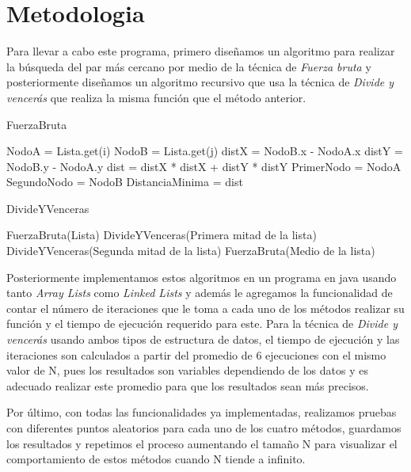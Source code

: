 \section{Metodologia}
Para llevar a cabo este programa, primero diseñamos un algoritmo para realizar la búsqueda del par más cercano por medio de la técnica de \textit{Fuerza bruta} y posteriormente diseñamos un algoritmo recursivo que usa la técnica de \textit{Divide y vencerás} que realiza la misma función que el método anterior.

\begin{algorithm}[H]	
\caption{FuerzaBruta}	
\begin{algorithmic}
\STATE NodoA = Lista.get(i)
\STATE NodoB = Lista.get(j)
\STATE distX = NodoB.x - NodoA.x
\STATE distY = NodoB.y - NodoA.y
\STATE dist = distX * distX + distY * distY
\STATE PrimerNodo = NodoA
\STATE SegundoNodo = NodoB
\STATE DistanciaMinima = dist
\ENDIF
\ENDFOR
\ENDFOR
\end{algorithmic}
\label{algo:factorial}	
\end{algorithm}

\begin{algorithm}[H]	
\caption{DivideYVenceras}	
\begin{algorithmic}
\STATE FuerzaBruta(Lista)
\ELSE
\STATE DivideYVenceras(Primera mitad de la lista)
\STATE DivideYVenceras(Segunda mitad de la lista)
\STATE FuerzaBruta(Medio de la lista)
\ENDIF
\end{algorithmic}
\label{algo:factorial}	
\end{algorithm}

Posteriormente implementamos estos algoritmos en un programa en java usando tanto \textit{Array Lists} como \textit{Linked Lists} y además le agregamos la funcionalidad de contar el número de iteraciones que le toma a cada uno de los métodos realizar su función y el tiempo de ejecución requerido para este. Para la técnica de \textit{Divide y vencerás} usando ambos tipos de estructura de datos, el tiempo de ejecución y las iteraciones son calculados a partir del promedio de  6 ejecuciones con el mismo valor de N, pues los resultados son variables dependiendo de los datos y es adecuado realizar este promedio para que los resultados sean más precisos.

Por último, con todas las funcionalidades ya implementadas, realizamos pruebas con diferentes puntos aleatorios para cada uno de los cuatro métodos, guardamos los resultados y repetimos el proceso aumentando el tamaño N para visualizar el comportamiento de estos métodos cuando N tiende a infinito.
